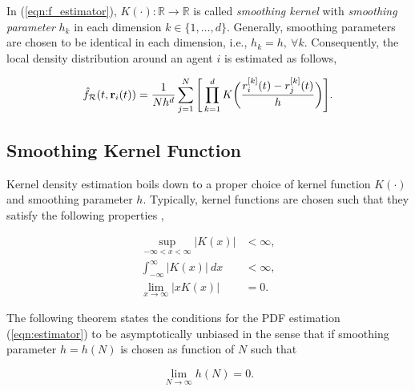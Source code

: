 \documentclass{ifacconf}
\newcommand{\Rconf}{{\mathcal R}}
\newcommand{\br}{{\bf r}}
\begin{document}
In (\ref{eqn:f_estimator}),  $K(\cdot): \mathbb{R} \rightarrow \mathbb{R}$ is called \emph{smoothing kernel}  with \emph{smoothing parameter} $h_k$ in each dimension $k \in \{1,\dots, d\}$. Generally, smoothing parameters are chosen to be identical in each dimension, i.e., $h_k = h,\ \forall k$. Consequently, the local density distribution around an agent $i$ is estimated as follows,

\begin{equation} \label{eqn:estimator}
	\hat{f}_\Rconf (t,\br_i(t)) = \frac{1}{N h^d} \sum_{j = 1}^{N} \Bigg[\prod_{k=1}^{d} K\bigg(\frac{r^{[k]}_i(t)-r^{[k]}_j(t)}{h}\bigg)\Bigg].
\end{equation}

\subsection{Smoothing Kernel Function}
Kernel density estimation boils down to a proper choice  of kernel function $K(\cdot)$ and smoothing parameter $h$. Typically, kernel functions are chosen such that they satisfy  the following properties \cite{parzen1962estimation},

\begin{subequations}\label{eqn:Kconditions}
	\begin{align} 
		\sup_{-\infty < x < \infty} \big|K(x)\big| &< \infty, \\
		\int_{-\infty}^{\infty} \big|K(x)\big| \ dx &< \infty, \\
		\lim\limits_{x \rightarrow \infty} \big|xK(x)\big| &= 0.
	\end{align}	
\end{subequations}

The following theorem \cite{bochner1955harmonic} states the conditions for the PDF estimation (\ref{eqn:estimator}) to be asymptotically unbiased in the sense that if smoothing parameter $h = h(N)$ is chosen as function of $N$ such that  

\begin{equation} \label{eqn:hformula}
	\lim\limits_{N \rightarrow \infty} h(N) = 0.
\end{equation}
\vspace{1mm}
\end{document}
